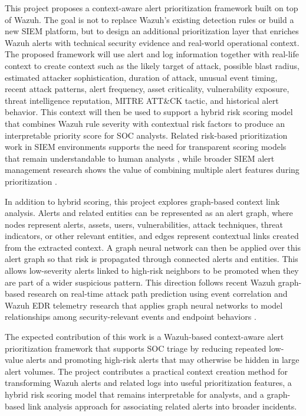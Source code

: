 \documentclass[10pt,letterpaper]{article}
\begin{document}
This project proposes a context-aware alert prioritization framework built on top of Wazuh. The goal is not to replace Wazuh's existing detection rules or build a new SIEM platform, but to design an additional prioritization layer that enriches Wazuh alerts with technical security evidence and real-world operational context. The proposed framework will use alert and log information together with real-life context to create context such as the likely target of attack, possible blast radius, estimated attacker sophistication, duration of attack, unusual event timing, recent attack patterns, alert frequency, asset criticality, vulnerability exposure, threat intelligence reputation, MITRE ATT\&CK tactic, and historical alert behavior. This context will then be used to support a hybrid risk scoring model that combines Wazuh rule severity with contextual risk factors to produce an interpretable priority score for SOC analysts. Related risk-based prioritization work in SIEM environments supports the need for transparent scoring models that remain understandable to human analysts \cite{ref9}, while broader SIEM alert management research shows the value of combining multiple alert features during prioritization \cite{ref10}.

In addition to hybrid scoring, this project explores graph-based context link analysis. Alerts and related entities can be represented as an alert graph, where nodes represent alerts, assets, users, vulnerabilities, attack techniques, threat indicators, or other relevant entities, and edges represent contextual links created from the extracted context. A graph neural network can then be applied over this alert graph so that risk is propagated through connected alerts and entities. This allows low-severity alerts linked to high-risk neighbors to be promoted when they are part of a wider suspicious pattern. This direction follows recent Wazuh graph-based research on real-time attack path prediction using event correlation \cite{ref4} and Wazuh EDR telemetry research that applies graph neural networks to model relationships among security-relevant events and endpoint behaviors \cite{ref11}.

The expected contribution of this work is a Wazuh-based context-aware alert prioritization framework that supports SOC triage by reducing repeated low-value alerts and promoting high-risk alerts that may otherwise be hidden in large alert volumes. The project contributes a practical context creation method for transforming Wazuh alerts and related logs into useful prioritization features, a hybrid risk scoring model that remains interpretable for analysts, and a graph-based link analysis approach for associating related alerts into broader incidents.
\end{document}
